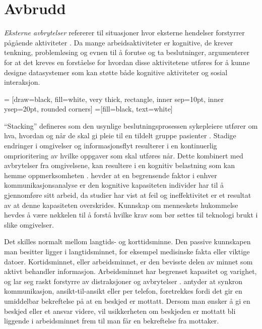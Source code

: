 \section{Avbrudd}
\label{sec:avbrudd}
\emph{Eksterne avbrytelser} refererer til situasjoner hvor eksterne hendelser forstyrrer pågående aktiviteter \citep{Harr07}. Da mange arbeidsaktiviteter er kognitive, de krever tenkning, problemløsing og evnen til å forutse og ta beslutninger, argumenterer \citet{Rogers94} for at det kreves en forståelse for hvordan disse aktivitetene utføres for å kunne designe datasystemer som kan støtte både kognitive aktiviteter og sosial interaksjon.

 = [draw=black, fill=white, very thick,
    rectangle, inner sep=10pt, inner ysep=20pt, rounded corners]
 =[fill=black, text=white]
%

\noindent
“Stacking” defineres som den usynlige beslutningsprosessen sykepleiere utfører om hva, hvordan og når de skal gi pleie til en tildelt gruppe pasienter \citep{Ebright10}. Stadige endringer i omgivelser og informasjonsflyt resulterer i en kontinuerlig omprioritering av hvilke oppgaver som skal utføres når. Dette kombinert med avbrytelser fra omgivelsene, kan resultere i en kognitiv belastning som kan hemme oppmerksomheten \citep{Ebright10}. \citet{Parker00} hevder at en begrensende faktor i enhver kommunikasjonsanalyse er den kognitive kapasiteten individer har til å gjennomføre sitt arbeid, da studier har vist at feil og ineffektivitet er et resultat av at denne kapasiteten overskrides. Kunnskap om menneskets hukommelse hevdes å være nøkkelen til å forstå hvilke krav som bør settes til teknologi brukt i slike omgivelser. 

\noindent
Det skilles normalt mellom langtids- og korttidsminne. Den passive kunnskapen man besitter ligger i langtidsminnet, for eksempel medisinske fakta eller viktige datoer. Kortidsminnet, eller arbeidsminnet, er den bevisste delen av minnet som aktivt behandler informasjon. Arbeidsminnet har begrenset kapasitet og varighet, og lar seg raskt forstyrre av distraksjoner og avbrytelser \citep{Parker00}. \citet{Coiera98} antyder at synkron kommunikasjon, ansikt-til-ansikt eller per telefon, foretrekkes fordi det gir en umiddelbar bekreftelse på at en beskjed er mottatt. Dersom man ønsker å gi en beskjed eller et ansvar videre, vil usikkerheten om beskjeden er mottatt bli liggende i arbeidsminnet frem til man får en bekreftelse fra mottaker. 

